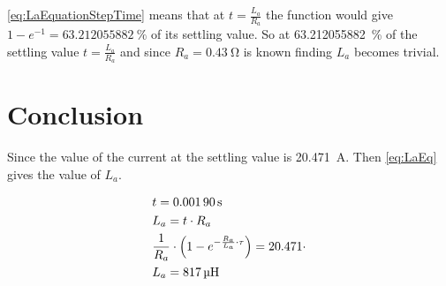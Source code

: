 \autoref{eq:LaEquationStepTime} means that at $t=\frac{L_a}{R_a}$ the function would give $1-e^{-1}=\SI{63.212055882}{\percent}$ of its settling value. So at \SI{63.212055882}{\percent} of the settling value $t=\frac{L_a}{R_a}$ and since $R_a=\SI{0.43}{\ohm}$ \cite{datasheet:saradc} is known finding $L_a$ becomes trivial.

\section*{Conclusion}

Since the value of the current at the settling value is \SI{20.471}{\ampere}. Then \autoref{eq:LaEq} gives the value of $L_a$.

\begin{subequations} \label{eq:LaEq}
	\begin{flalign}
	&t = \SI{0.00190}{\second} \\
	&L_a=t \cdot R_a \\
	&\frac{1}{R_a}\cdot \left(1-e^{-\frac{R_a}{L_a}\cdot \tau}\right)=20.471\cdot  \addunit{\second} \\
	&L_a=\SI{817}{\micro\henry}
	\end{flalign}
\end{subequations}
\startexplain
{}
\stopexplain

